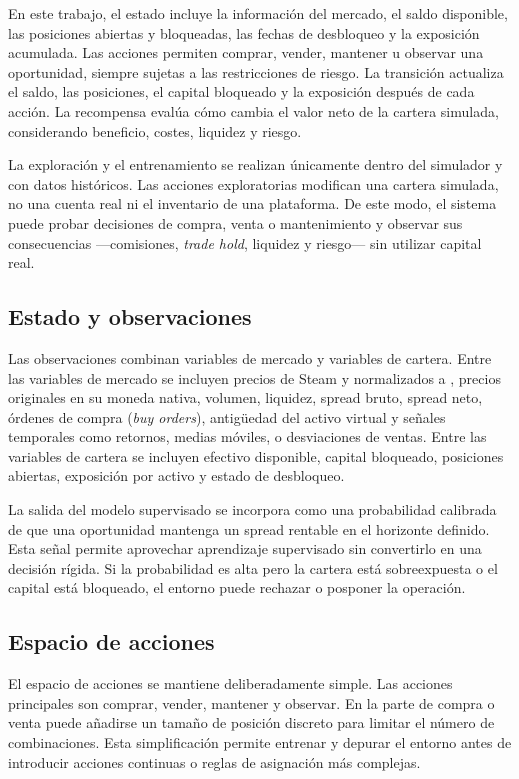 En este trabajo, el estado incluye la información del mercado, el saldo disponible, las posiciones abiertas y bloqueadas, las fechas de desbloqueo y la exposición acumulada. Las acciones permiten comprar, vender, mantener u observar una oportunidad, siempre sujetas a las restricciones de riesgo. La transición actualiza el saldo, las posiciones, el capital bloqueado y la exposición después de cada acción. La recompensa evalúa cómo cambia el valor neto de la cartera simulada, considerando beneficio, costes, liquidez y riesgo.

La exploración y el entrenamiento se realizan únicamente dentro del simulador y con datos históricos. Las acciones exploratorias modifican una cartera simulada, no una cuenta real ni el inventario de una plataforma. De este modo, el sistema puede probar decisiones de compra, venta o mantenimiento y observar sus consecuencias ---comisiones, \textit{trade hold}, liquidez y riesgo--- sin utilizar capital real.

\subsection{Estado y observaciones}

Las observaciones combinan variables de mercado y variables de cartera. Entre las variables de mercado se incluyen precios de Steam y  normalizados a , precios originales en su moneda nativa, volumen, liquidez, spread bruto, spread neto, órdenes de compra (\textit{buy orders}), antigüedad del activo virtual y señales temporales como retornos, medias móviles,  o desviaciones de ventas. Entre las variables de cartera se incluyen efectivo disponible, capital bloqueado, posiciones abiertas, exposición por activo y estado de desbloqueo.

La salida del modelo supervisado se incorpora como una probabilidad calibrada de que una oportunidad mantenga un spread rentable en el horizonte definido. Esta señal permite aprovechar aprendizaje supervisado sin convertirlo en una decisión rígida. Si la probabilidad es alta pero la cartera está sobreexpuesta o el capital está bloqueado, el entorno puede rechazar o posponer la operación.

\subsection{Espacio de acciones}

El espacio de acciones se mantiene deliberadamente simple. Las acciones principales son comprar, vender, mantener y observar. En la parte de compra o venta puede añadirse un tamaño de posición discreto para limitar el número de combinaciones. Esta simplificación permite entrenar y depurar el entorno antes de introducir acciones continuas o reglas de asignación más complejas.

